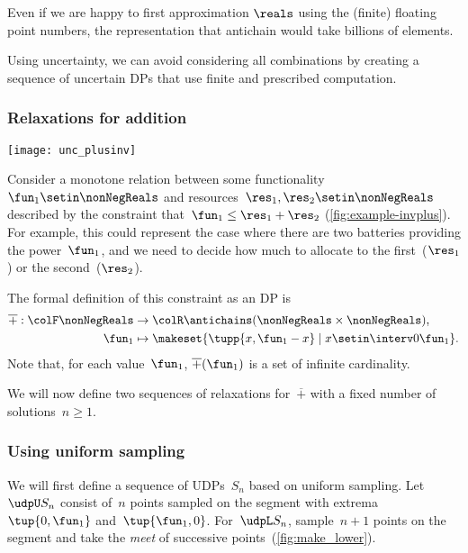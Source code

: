 Even if we are happy to first approximation $\reals$ using the (finite) floating point numbers, the representation that antichain would take billions of elements.

Using uncertainty, we can avoid considering all combinations by creating a sequence of uncertain DPs that use finite and prescribed computation.


\subsubsection{Relaxations for addition}

\begin{marginfigure}
    \centering
    \texttt{[image: unc\_plusinv]}
    \caption{}
    \label{fig:example-invplus}
\end{marginfigure}

Consider a monotone relation between some functionality~$\fun_{1}\setin\nonNegReals$ and resources~$\res_{1},\res_{2}\setin\nonNegReals$ described by the constraint that~$\fun_{1}\leq\res_{1}+\res_{2}$ (\cref{fig:example-invplus}).
For example, this could represent the case where there are two batteries providing the power~$\fun_{1}$, and we need to decide how much to allocate to the first~($\res_{1}$) or the second~($\res_{2}$).

The formal definition of this constraint as an DP is
\begin{align*}
    \overline{+}:{\colF\nonNegReals} & \rightarrow{\colR\antichains(\nonNegReals\times\nonNegReals)}, \\
    \fun_{1}                         & \mapsto\makeset{\tupp{ x,\fun_{1}-x} \mid x \setin \interv0{\fun_1}}.
\end{align*}
Note that, for each value~$\fun_{1}$, $\overline{+}(\fun_{1})$ is a set of infinite cardinality.

We will now define two sequences of relaxations for~$\overline{+}$ with a fixed number of solutions~$n\geq1$.

\subsubsection*{Using uniform sampling}

We will first define a sequence of UDPs~$S_{n}$ based on uniform sampling.
Let~$\udpU S_{n}$ consist of~$n$ points sampled on the segment with extrema~$\tup{0,\fun_{1}}$ and~$\tup{\fun_{1},0} $.
For~$\udpL S_{n}$, sample~$n+1$ points on the segment and take the \emph{meet} of successive points~(\cref{fig:make_lower}).

